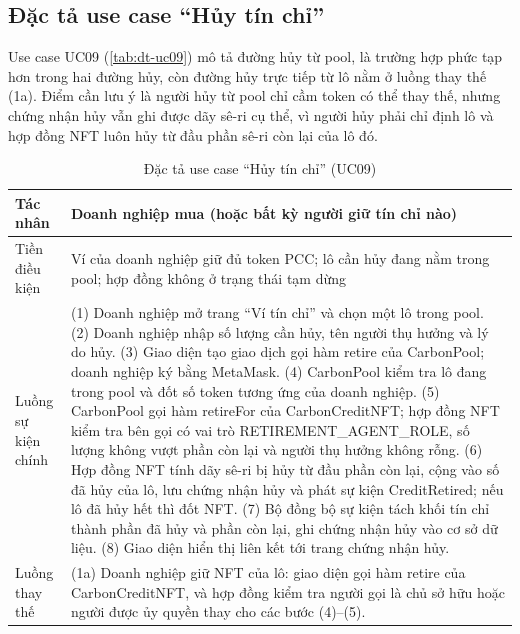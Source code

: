\subsection*{Đặc tả use case ``Hủy tín chỉ''}
\label{subsec:dt-uc09}

Use case UC09 (\autoref{tab:dt-uc09}) mô tả đường hủy từ pool, là trường hợp phức tạp hơn trong hai đường hủy, còn đường hủy trực tiếp từ lô nằm ở luồng thay thế (1a). Điểm cần lưu ý là người hủy từ pool chỉ cầm token có thể thay thế, nhưng chứng nhận hủy vẫn ghi được dãy sê-ri cụ thể, vì người hủy phải chỉ định lô và hợp đồng NFT luôn hủy từ đầu phần sê-ri còn lại của lô đó.

\begin{table}[!htbp]
    \centering
    \caption{Đặc tả use case ``Hủy tín chỉ'' (UC09)}
    \label{tab:dt-uc09}
    \small
    \begin{tabularx}{\textwidth}{|L{2.8cm}|Y|}
        \hline
        Tác nhân & Doanh nghiệp mua (hoặc bất kỳ người giữ tín chỉ nào) \\
        \hline
        Tiền điều kiện & Ví của doanh nghiệp giữ đủ token PCC; lô cần hủy đang nằm trong pool; hợp đồng không ở trạng thái tạm dừng \\
        \hline
        Luồng sự kiện chính & (1) Doanh nghiệp mở trang ``Ví tín chỉ'' và chọn một lô trong pool.\newline
        (2) Doanh nghiệp nhập số lượng cần hủy, tên người thụ hưởng và lý do hủy.\newline
        (3) Giao diện tạo giao dịch gọi hàm retire của CarbonPool; doanh nghiệp ký bằng MetaMask.\newline
        (4) CarbonPool kiểm tra lô đang trong pool và đốt số token tương ứng của doanh nghiệp.\newline
        (5) CarbonPool gọi hàm retireFor của CarbonCreditNFT; hợp đồng NFT kiểm tra bên gọi có vai trò RETIREMENT\_AGENT\_ROLE, số lượng không vượt phần còn lại và người thụ hưởng không rỗng.\newline
        (6) Hợp đồng NFT tính dãy sê-ri bị hủy từ đầu phần còn lại, cộng vào số đã hủy của lô, lưu chứng nhận hủy và phát sự kiện CreditRetired; nếu lô đã hủy hết thì đốt NFT.\newline
        (7) Bộ đồng bộ sự kiện tách khối tín chỉ thành phần đã hủy và phần còn lại, ghi chứng nhận hủy vào cơ sở dữ liệu.\newline
        (8) Giao diện hiển thị liên kết tới trang chứng nhận hủy. \\
        \hline
        Luồng thay thế & (1a) Doanh nghiệp giữ NFT của lô: giao diện gọi hàm retire của CarbonCreditNFT, và hợp đồng kiểm tra người gọi là chủ sở hữu hoặc người được ủy quyền thay cho các bước (4)–(5).\newline

\end{tabularx}
\end{table}
